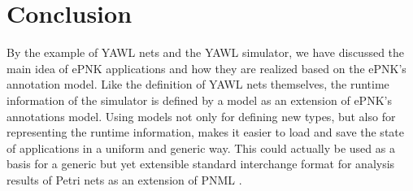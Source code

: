 \documentclass[a4paper]{llncs}
\begin{document}
\section{Conclusion}
\label{sec:conclusion}

By the example of YAWL nets and the YAWL simulator, we have discussed the
main idea of ePNK applications and how they are realized based on the ePNK's
annotation model. Like the definition of YAWL nets themselves, the
runtime information of the simulator is defined by a model as an extension
of ePNK's annotations model. Using models not
only for defining new types, but also for representing the runtime information,
makes it easier to load and save the state of applications in a uniform and
generic way. This could actually be used as a basis for a generic but yet
extensible standard interchange format for analysis results of Petri nets as
an extension of PNML \cite{HKea09,ISO-IEC:15909-2-2011}. 

% 
% 


\end{document}

